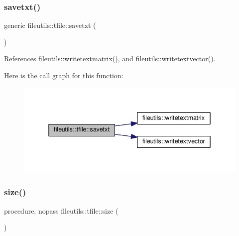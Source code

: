 \mbox{\label{structfileutils_1_1tfile_a3157f41086d721e24f9bfd553742ecfa}} 
\subsubsection{\texorpdfstring{savetxt()}{savetxt()}}
{\footnotesize\ttfamily generic fileutils\+::tfile\+::savetxt (\begin{DoxyParamCaption}{ }\end{DoxyParamCaption})\hspace{0.3cm}{\ttfamily [private]}}



References fileutils\+::writetextmatrix(), and fileutils\+::writetextvector().

Here is the call graph for this function\+:
\nopagebreak
\begin{figure}[H]
\begin{center}
\leavevmode
\includegraphics[width=342pt]{structfileutils_1_1tfile_a3157f41086d721e24f9bfd553742ecfa_cgraph}
\end{center}
\end{figure}
\mbox{\label{structfileutils_1_1tfile_ab109150a80fd9a3e7e9891127698d592}} 
\subsubsection{\texorpdfstring{size()}{size()}}
{\footnotesize\ttfamily procedure, nopass fileutils\+::tfile\+::size (\begin{DoxyParamCaption}{ }\end{DoxyParamCaption})\hspace{0.3cm}{\ttfamily [private]}}



